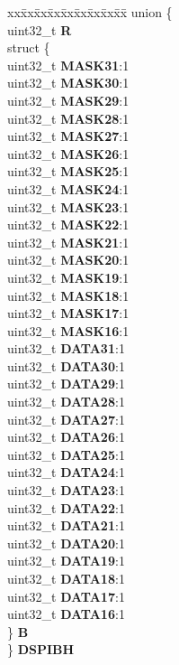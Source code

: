 \begin{DoxyCompactItemize}
\begin{tabbing}
\end{tabbing}\item 
\mbox{\label{structSIU__tag_a88bf14c152f1ae053963857b84089a28}} 
\begin{tabbing}
xx\=xx\=xx\=xx\=xx\=xx\=xx\=xx\=xx\=\kill
union \{\\
\>uint32\_t {\bfseries R}\\
\>struct \{\\
\>\>uint32\_t {\bfseries MASK31}:1\\
\>\>uint32\_t {\bfseries MASK30}:1\\
\>\>uint32\_t {\bfseries MASK29}:1\\
\>\>uint32\_t {\bfseries MASK28}:1\\
\>\>uint32\_t {\bfseries MASK27}:1\\
\>\>uint32\_t {\bfseries MASK26}:1\\
\>\>uint32\_t {\bfseries MASK25}:1\\
\>\>uint32\_t {\bfseries MASK24}:1\\
\>\>uint32\_t {\bfseries MASK23}:1\\
\>\>uint32\_t {\bfseries MASK22}:1\\
\>\>uint32\_t {\bfseries MASK21}:1\\
\>\>uint32\_t {\bfseries MASK20}:1\\
\>\>uint32\_t {\bfseries MASK19}:1\\
\>\>uint32\_t {\bfseries MASK18}:1\\
\>\>uint32\_t {\bfseries MASK17}:1\\
\>\>uint32\_t {\bfseries MASK16}:1\\
\>\>uint32\_t {\bfseries DATA31}:1\\
\>\>uint32\_t {\bfseries DATA30}:1\\
\>\>uint32\_t {\bfseries DATA29}:1\\
\>\>uint32\_t {\bfseries DATA28}:1\\
\>\>uint32\_t {\bfseries DATA27}:1\\
\>\>uint32\_t {\bfseries DATA26}:1\\
\>\>uint32\_t {\bfseries DATA25}:1\\
\>\>uint32\_t {\bfseries DATA24}:1\\
\>\>uint32\_t {\bfseries DATA23}:1\\
\>\>uint32\_t {\bfseries DATA22}:1\\
\>\>uint32\_t {\bfseries DATA21}:1\\
\>\>uint32\_t {\bfseries DATA20}:1\\
\>\>uint32\_t {\bfseries DATA19}:1\\
\>\>uint32\_t {\bfseries DATA18}:1\\
\>\>uint32\_t {\bfseries DATA17}:1\\
\>\>uint32\_t {\bfseries DATA16}:1\\
\>\} {\bfseries B}\\
\} {\bfseries DSPIBH}\\


\end{tabbing}
\end{DoxyCompactItemize}
